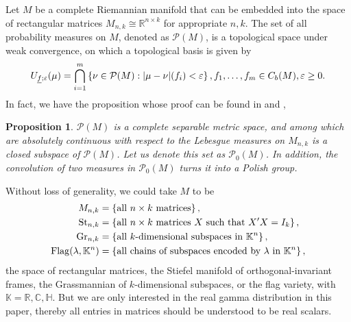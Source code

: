 \documentclass{amsart}
\newtheorem{proposition}[theorem]{Proposition}
\theoremstyle{definition}
\numberwithin{equation}{section}
\begin{document}
Let $M$ be a complete Riemannian manifold that can be embedded into the space of rectangular matrices $M_{n,k}\cong \mathbb{R}^{n\times k}$ for appropriate $n,k$. The set of all probability measures on $M$, denoted as $\mathcal{P}(M)$, is a 
topological space under weak convergence, on which a topological basis is given by 
\[U_{\underline{f};\varepsilon}(\mu) = \bigcap_{i=1}^m\left\{\nu \in \mathcal{P}(M):|\mu-\nu|(f_i)< \varepsilon\right\},\\ f_{1},\dots,f_{m} \in C_b(M), \varepsilon\geq 0.\]
In fact, we have the proposition whose proof can be found in \cite[Section 5]{billingsley2013convergence} and \cite[Theorem 17.23]{kechris2012classical}, 
\begin{proposition}
    $\mathcal{P}(M)$ is a complete separable metric space, and among which are absolutely continuous with respect to the Lebesgue measures on $M_{n,k} $ is a closed subspace of $\mathcal{P}(M)$. 
    Let us denote this set as $\mathcal{P}_{0}(M)$. In addition, the convolution of two measures in $\mathcal{P}_0(M)$ turns it into a Polish group.
\end{proposition}

Without loss of generality, we could take $M$ to be
\[\begin{aligned}
    M_{n,k} & = \left\{\text{all } n\times k \text{ matrices}\right\},\\
    {\rm St}_{n,k} & = \left\{\text{all } n\times k \text{ matrices $X$ such that } X'X =I_k\right\},\\
    {\rm Gr}_{n,k} & = \left\{\text{all } k\text{-dimensional subspaces in } \mathbb{K}^n\right\},\\
    {\rm Flag}(\lambda,\mathbb{K}^n) & = \left\{\text{all chains of subspaces encoded by } \lambda \text{ in } \mathbb{K}^n\right\},
\end{aligned}\]
the space of rectangular matrices, the Stiefel manifold of orthogonal-invariant frames, the Grassmannian of $k$-dimensional subspaces, or the flag variety, with $\mathbb{K} = \mathbb R, \mathbb C, \mathbb H.$ But we are only interested in the real gamma distribution in this paper, thereby all entries in matrices should be understood to be real scalars. 
\end{document}
